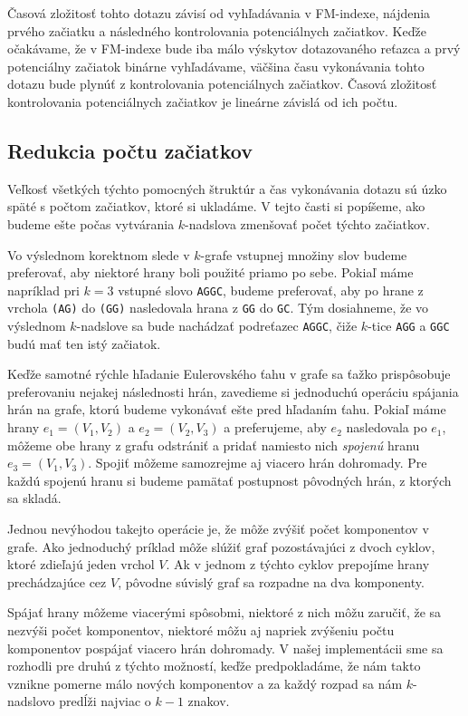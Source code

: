 Časová zložitosť tohto dotazu závisí od vyhľadávania v FM-indexe, nájdenia
prvého začiatku a následného
kontrolovania potenciálnych začiatkov. Keďže očakávame, že v FM-indexe bude
iba málo výskytov dotazovaného reťazca a prvý potenciálny začiatok binárne
vyhľadávame, väčšina času vykonávania tohto dotazu bude plynúť z kontrolovania
potenciálnych začiatkov. Časová zložitosť kontrolovania potenciálnych začiatkov
je lineárne závislá od ich počtu.

\subsection{Redukcia počtu začiatkov}

Veľkosť všetkých týchto pomocných štruktúr a čas vykonávania
dotazu sú úzko späté s počtom začiatkov, ktoré si ukladáme. V tejto
časti si popíšeme, ako budeme ešte počas vytvárania $k$-nadslova zmenšovať
počet týchto začiatkov.

Vo výslednom korektnom slede v $k$-grafe vstupnej
množiny slov budeme preferovať, aby niektoré hrany boli použité priamo po sebe.
Pokiaľ máme napríklad pri $k = 3$ vstupné slovo \verb_AGGC_, budeme preferovať,
aby po hrane z vrchola \verb_(AG)_ do \verb_(GG)_ nasledovala hrana z \verb_GG_
do \verb_GC_. Tým dosiahneme, že vo výslednom $k$-nadslove sa bude nachádzať
podreťazec \verb_AGGC_, čiže $k$-tice \verb_AGG_ a \verb_GGC_ budú mať ten istý
začiatok.

Keďže samotné rýchle hľadanie Eulerovského ťahu v grafe sa ťažko prispôsobuje
preferovaniu nejakej následnosti hrán, zavedieme si jednoduchú
operáciu spájania hrán na grafe, ktorú budeme vykonávať ešte pred hľadaním ťahu. Pokiaľ
máme hrany $e_1 = (V_1, V_2)$ a $e_2 = (V_2, V_3)$ a preferujeme, aby $e_2$
nasledovala po $e_1$, môžeme obe hrany z grafu odstrániť a pridať namiesto nich \emph{spojenú}
hranu $e_3 = (V_1, V_3)$. Spojiť môžeme samozrejme aj viacero hrán dohromady. Pre
každú spojenú hranu si budeme pamätať postupnost pôvodných hrán, z ktorých sa
skladá.

Jednou nevýhodou takejto operácie je, že môže zvýšiť počet komponentov v grafe.
Ako jednoduchý príklad môže slúžiť graf pozostávajúci z dvoch cyklov, ktoré
zdieľajú jeden vrchol $V$. Ak v jednom z týchto cyklov prepojíme hrany
prechádzajúce cez $V$, pôvodne súvislý graf sa rozpadne na dva komponenty.

Spájať hrany môžeme viacerými spôsobmi, niektoré z nich môžu zaručiť, že sa
nezvýši počet komponentov, niektoré môžu aj napriek zvýšeniu počtu komponentov
pospájať viacero hrán dohromady. V našej implementácii sme sa rozhodli pre druhú
z týchto možností, keďže predpokladáme, že nám takto vznikne pomerne málo nových
komponentov a za každý rozpad sa nám $k$-nadslovo predĺži najviac o $k-1$ znakov.

